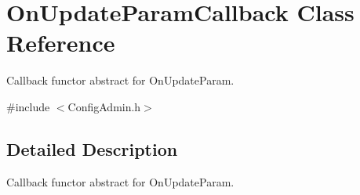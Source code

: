 \section{OnUpdateParamCallback Class Reference}
\label{classOnUpdateParamCallback}


Callback functor abstract for OnUpdateParam.  




{\ttfamily \#include $<$ConfigAdmin.h$>$}



\subsection{Detailed Description}
Callback functor abstract for OnUpdateParam. 